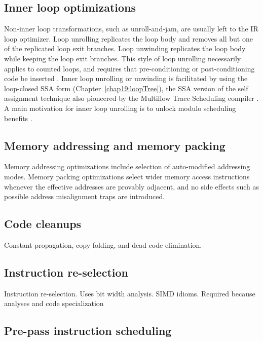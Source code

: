 \subsection{Inner loop optimizations}

Non-inner loop transformations, such as
unroll-and-jam, are usually left to the IR loop optimizer. Loop unrolling
replicates the loop body and removes all but one of the replicated loop exit
branches. Loop unwinding replicates the loop body while keeping the loop exit
branches. This style of loop unrolling necessarily applies to counted loops, and
requires that pre-conditioning or post-conditioning code be inserted
\cite{Lowney:1992:JS}. Inner loop unrolling or unwinding is facilitated by using
the loop-closed SSA form (Chapter~\ref{chap19:loopTree}), the SSA version of the
self assignment technique also pioneered by the Multiflow Trace Scheduling
compiler \cite{Lowney:1992:JS}. A main motivation for inner loop unrolling is to
unlock modulo scheduling benefits \cite{Lavery:1995:MICRO}.



\subsection{Memory addressing and memory packing}

Memory addressing optimizations include selection of auto-modified addressing
modes. Memory packing optimizations select wider memory access instructions
whenever the effective addresses are provably adjacent, and no side effects such
as possible address misalignment traps are introduced.

\subsection{Code cleanups}

Constant propagation, copy folding, and dead code elimination.

\subsection{Instruction re-selection}

Instruction re-selection. Uses bit width analysis. SIMD idioms.
Required because analyses and code specialization

\subsection{Pre-pass instruction scheduling}

